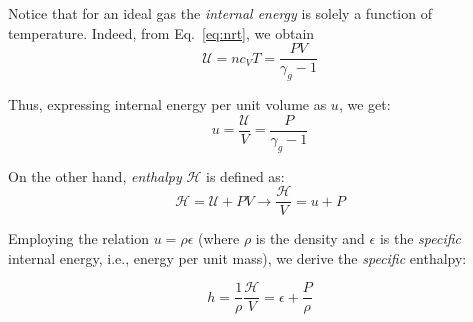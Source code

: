 Notice that for an ideal gas the \emph{internal energy} is solely a function of temperature. Indeed, from Eq.~\ref{eq:nrt}, we obtain 
\begin{equation}
\mathcal U = n c_V T = \frac{PV}{\gamma_g - 1}
\end{equation}

Thus, expressing internal energy per unit volume as \(u\), we get:
%
\begin{equation}
u = \frac{\mathcal U}{V} = \frac{P}{\gamma_g - 1}
\end{equation}

On the other hand, \emph{enthalpy} \( \mathcal H\) is defined as:
\[
\mathcal H = \mathcal U + PV \rightarrow  \frac{\mathcal H}{V} = u + P
\]

Employing the relation \(u = \rho \epsilon\) (where \(\rho\) is the density and \(\epsilon\) is the \emph{specific} internal energy, i.e., energy per unit mass), we derive the \emph{specific} enthalpy:
\begin{remark}
\begin{equation}
h = \frac{1}{\rho} \frac{\mathcal H}{V} = \epsilon + \frac{P}{\rho}
\end{equation}
\end{remark}



